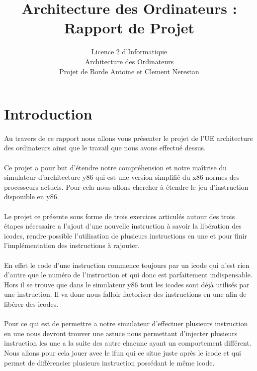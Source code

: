 \documentclass[12pt]{article}
\title{Architecture des Ordinateurs : Rapport de Projet}
\author{Licence 2 d'Informatique\\ 
  Architecture des Ordinateurs\\
  Projet de Borde Antoine et Clement Nerestan}
\begin{document}
\maketitle

\newpage

\tableofcontents

\newpage

\section*{Introduction}

\paragraph{} Au travers de ce rapport nous allons vous présenter le projet
 de l'UE architecture des ordinateurs ainsi que le travail que nous avons 
 effectué dessus.

\paragraph{} Ce projet a pour but d'étendre notre compréhension et notre 
maîtrise du simulateur d'architecture y86 qui est une version simplifié
du x86 normes des processeurs actuels. Pour cela nous allons chercher à 
étendre le jeu d'instruction disponible en y86.

\paragraph{} Le projet ce présente sous forme de trois exercices
articulés autour des trois étapes
nécessaire a l'ajout d'une nouvelle instruction à savoir la libération
des icodes, rendre possible l'utilisation de plusieurs instructions en
une et pour finir l’implémentation des instructions à rajouter.

\paragraph{} En effet le code d'une instruction commence toujours par un
 icode qui n'est rien d'autre que le numéro de l'instruction et qui
 donc est parfaitement indispensable. Hors il se trouve que dans le simulateur
 y86 tout les icodes sont déjà utilisés par une instruction. Il va donc nous
 falloir factoriser des instructions en une afin de libérer des icodes.

\paragraph{} Pour ce qui est de permettre a notre simulateur d’effectuer
plusieurs instruction en une nous devront trouver une astuce nous permettant
d'injecter plusieurs instruction les une a la suite des autre chacune ayant un
comportement différent. Nous allons pour cela jouer avec le ifun qui ce situe
juste après le icode et qui permet de différencier plusieurs instruction possédant le même icode.
\end{document}

